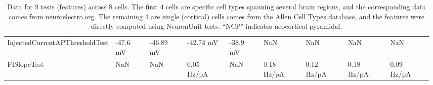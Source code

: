 \begin{table}[ht]
{\begin{tabular}{|l|l|l|l|l|l|l|l|l|}
InjectedCurrentAPThresholdTest &                       -47.6 mV &                -46.89 mV &                          -42.74 mV &     -38.9 mV &            NaN &            NaN &            NaN &            NaN \\
FISlopeTest                         &                            NaN &                      NaN &                         0.05 Hz/pA &          NaN &     0.18 Hz/pA &     0.12 Hz/pA &     0.18 Hz/pA &     0.09 Hz/pA \\
\bottomrule
\end{tabular}}
\caption[Neuroelectro Data]{Data for 9 tests (features) across 8 cells.
The first 4 cells are specific cell types spanning several brain regions, and the corresponding data comes from neuroelectro.org.
The remaining 4 are single (cortical) cells comes from the Allen Cell Types database, and the features were directly computed using NeuronUnit tests.
``NCP" indicates neocortical pyramidal.}
\label{tab:neuroelectro-data}
\end{table}

